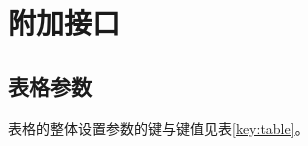 \documentclass[oneside]{book}
\begin{document}
\chapter{附加接口}

\section{表格参数}

表格的整体设置参数的键与键值见表\ref{key:table}。
\end{document}
